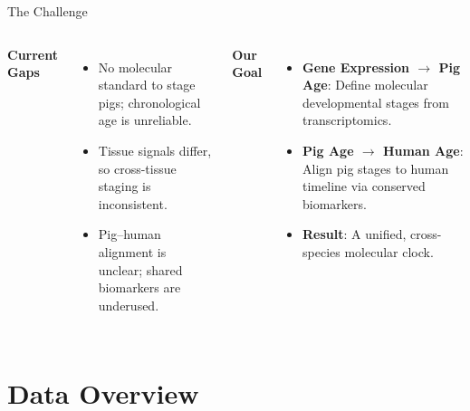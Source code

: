 \documentclass[aspectratio=169, 11pt, t]{beamer}
\newcommand{\cardiffHeading}[1]{\textcolor{CardiffBlack}{\fontsize{12}{15}\selectfont \textbf{#1}}}
\begin{document}
\begin{frame}{The Challenge}
    \vspace{0.5cm}
    \begin{columns}[T, onlytextwidth]
            \hspace{0.22cm}\cardiffHeading{Current Gaps}
            \vspace{0.5em}
            \begin{itemize}
                \item No molecular standard to stage pigs; chronological age is unreliable.
                \item Tissue signals differ, so cross-tissue staging is inconsistent.
                \item Pig--human alignment is unclear; shared biomarkers are underused.
            \end{itemize}

            \cardiffHeading{Our Goal}
            \vspace{0.5em}
            \begin{itemize}
                \item \textbf{Gene Expression $\rightarrow$ Pig Age}: Define molecular developmental stages from transcriptomics.
                \item \textbf{Pig Age $\rightarrow$ Human Age}: Align pig stages to human timeline via conserved biomarkers.
                \item \textbf{Result}: A unified, cross-species molecular clock.
            \end{itemize}
    \end{columns}
\end{frame}

\section{Data Overview}
\end{document}
